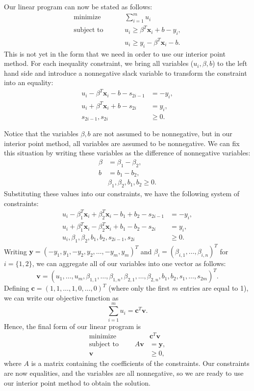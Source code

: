 Our linear program can now be stated as follows:
\begin{align*}
\text{minimize }\qquad &\sum_{i=1}^m u_i\\
\text{subject to }\qquad &u_i \geq \beta^T\mathbf{x}_i + b - y_i,\\
&u_i \geq y_i - \beta^T\mathbf{x}_i - b.
\end{align*}
This is not yet in the form that we need in order to use our interior point method.
For each inequality constraint, we bring all variables ($u_i, \beta, b$) to the left hand side and
introduce a nonnegative slack variable to transform the constraint into an equality:
\begin{align*}
u_i  - \beta^T\mathbf{x}_i - b - s_{2i-1}&= -y_i,\\
u_i +\beta^T\mathbf{x}_i + b - s_{2i}&= y_i,\\
s_{2i-1}, s_{2i}&\geq 0.
\end{align*}

Notice that the variables $\beta, b$ are not assumed to be nonnegative, but in our interior point method, all variables are assumed
to be nonnegative. We can fix this situation by writing these variables as the difference of nonnegative variables:
\begin{align*}
  \beta &= \beta_1 - \beta_2,\\
  b &= b_1 - b_2,\\
  &\beta_1, \beta_2, b_1, b_2 \geq 0.
\end{align*}
Substituting these values into our constraints, we have the following system of constraints:
\begin{align*}
u_i  - \beta_1^T\mathbf{x}_i + \beta_2^T\mathbf{x}_i - b_1 + b_2 - s_{2i-1}&= -y_i,\\
u_i + \beta_1^T\mathbf{x}_i - \beta_2^T\mathbf{x}_i + b_1 - b_2 - s_{2i}&= y_i,\\
u_i, \beta_1, \beta_2, b_1, b_2, s_{2i-1}, s_{2i}&\geq 0.
\end{align*}
Writing $\mathbf{y} = (-y_1, y_1, -y_2, y_2, \ldots, -y_m, y_m)^T$ and $\beta_i = (\beta_{i,1}, \ldots, \beta_{i,n})^T$ for $i = \{1, 2\}$,
we can aggregate all of our variables into one vector as follows:
\[
\mathbf{v} = (u_1,\ldots, u_m, \beta_{1,1},\ldots, \beta_{1,n}, \beta_{2,1},\ldots, \beta_{2,n}, b_1, b_2, s_1,\ldots,s_{2m})^T.
\]
Defining $\mathbf{c} = (1, 1, \ldots, 1, 0, \ldots, 0)^T$ (where only the first $m$ entries are equal to 1), we can write our
objective function as
\[
\sum_{i=1}^m u_i = \mathbf{c}^T\mathbf{v}.
\]
Hence, the final form of our linear program is
\begin{align*}
  \text{minimize }\qquad &\mathbf{c}^T\mathbf{v}\\
  \text{subject to }\qquad A\mathbf{v} &= \mathbf{y},\\
  \mathbf{v} &\geq 0,
\end{align*}
where $A$ is a matrix containing the coefficients of the constraints.
Our constraints are now equalities, and the variables are all nonnegative, so we are ready to use our interior point method to obtain
the solution.

